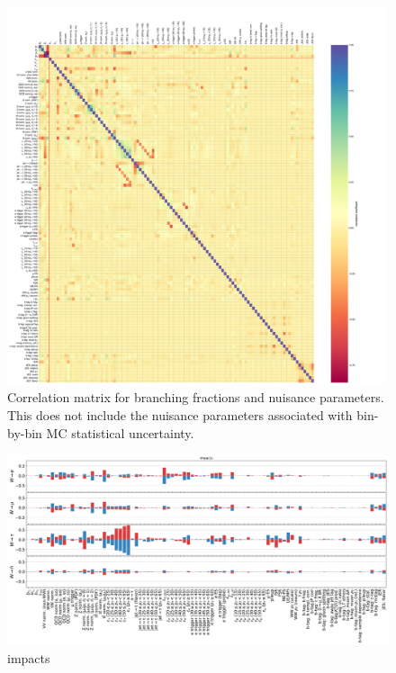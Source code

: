 \begin{figure}[ht]
    \centering
    \includegraphics[width=0.99\textwidth]{chapters/Analysis/sectionSystematics/figures/correlation_matrix_unblinded.pdf}
    \caption{Correlation matrix for branching fractions and nuisance
        parameters.  This does not include the nuisance parameters
        associated with bin-by-bin MC statistical uncertainty.}
    \label{fig:corr_matrix}
\end{figure}

\begin{figure}[ht]
    \centering
    \includegraphics[width=1.2\textwidth, angle=-90]{chapters/Analysis/sectionSystematics/figures/unblinded_impacts.pdf}
    \caption{impacts}
    \label{fig:impacts_all}
\end{figure}

